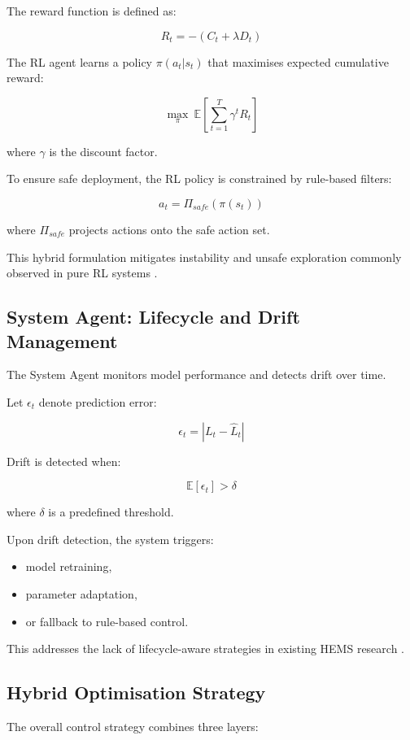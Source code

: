 \documentclass[11pt,a4paper]{article}
\begin{document}
The reward function is defined as:

$$
R_t = - \left( C_t + \lambda D_t \right)
$$

The RL agent learns a policy $\pi(a_t | s_t)$ that maximises expected cumulative reward:

$$
\max_{\pi} \ \mathbb{E} \left[ \sum_{t=1}^{T} \gamma^t R_t \right]
$$

where $\gamma$ is the discount factor.

To ensure safe deployment, the RL policy is constrained by rule-based filters:

$$
a_t = \Pi_{safe}(\pi(s_t))
$$

where $\Pi_{safe}$ projects actions onto the safe action set.

This hybrid formulation mitigates instability and unsafe exploration commonly observed in pure RL systems \cite{garcia2015comprehensive}.

\subsection{System Agent: Lifecycle and Drift Management}

The System Agent monitors model performance and detects drift over time.

Let $\epsilon_t$ denote prediction error:

$$
\epsilon_t = |L_t - \hat{L}_t|
$$

Drift is detected when:

$$
\mathbb{E}[\epsilon_t] > \delta
$$

where $\delta$ is a predefined threshold.

Upon drift detection, the system triggers:
\begin{itemize}
    \item model retraining,
    \item parameter adaptation,
    \item or fallback to rule-based control.
\end{itemize}

This addresses the lack of lifecycle-aware strategies in existing HEMS research \cite{dincecco2020transfer}.

\subsection{Hybrid Optimisation Strategy}

The overall control strategy combines three layers:
\end{document}
